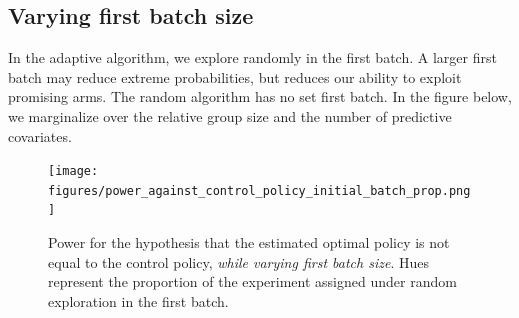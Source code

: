 \documentclass[letterpaper, 12pt, parskip=full,DIV=10]{scrartcl}
\begin{document}
\subsection{Varying first batch size}
In the adaptive algorithm, we explore randomly in the first batch. A larger first batch may reduce extreme probabilities, but reduces our ability to exploit promising arms. The random algorithm has no set first batch. In the figure below, we marginalize over the relative group size and the number of predictive covariates. 

\begin{figure}[H]
\centering
\texttt{[image: figures/power\_against\_control\_policy\_initial\_batch\_prop.png]}
\caption{Power for the hypothesis that the estimated optimal policy is not equal to the control policy, \textit{while varying first batch size}. Hues represent the proportion of the experiment assigned under random exploration in the first batch. }
\label{fig:power_control_initial_batch_prop}
\end{figure}


%
%
\end{document}
